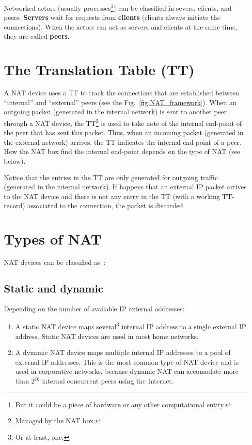 Networked actors (usually processes\footnote{But it could be a piece
  of hardware or any other computational entity.}) can be classified
in severs, clients, and peers. \textbf{Servers} wait for requests from
\textbf{clients} (clients always initiate the connections). When the
actors can act as servers and clients at the same time, they are
called \textbf{peers}.

\section{The Translation Table (TT)}

A NAT device uses a TT to track the connections that are established
between ``internal'' and ``external'' peers (see the
Fig.~\ref{fig:NAT_framework}). When an outgoing packet (generated in
the internal network) is sent to another peer through a NAT device,
the TT\footnote{Managed by the NAT box.} is used to take note of the
internal end-point of the peer that has sent this packet. Thus, when
an incoming packet (generated in the external network) arrives, the TT
indicates the internal end-point of a peer. How the NAT box find the
internal end-point depends on the type of NAT (see below).

Notice that the entries in the TT are only generated for outgoing
traffic (generated in the internal network). If happens that an
external IP packet arrives to the NAT device and there is not any
entry in the TT (with a working TT-record) associated to the
connection, the packet is discarded.

\section{Types of NAT}

NAT devices can be classified as~\cite{jennings2007network}:

\subsection{Static and dynamic}

Depending on the number of available IP external addresses:

\begin{enumerate}
\item A static NAT device maps several\footnote{Or at least, one.}
  internal IP address to a single external IP address. Static NAT
  devices are used in most home networks.
\item A dynamic NAT device maps multiple internal IP addresses to a
  pool of external IP addresses. This is the most common type of NAT
  device and is used in corporative networks, because dynamic NAT can
  accomodate more than $2^{16}$ internal concurrent peers using the
  Internet.
\end{enumerate}

